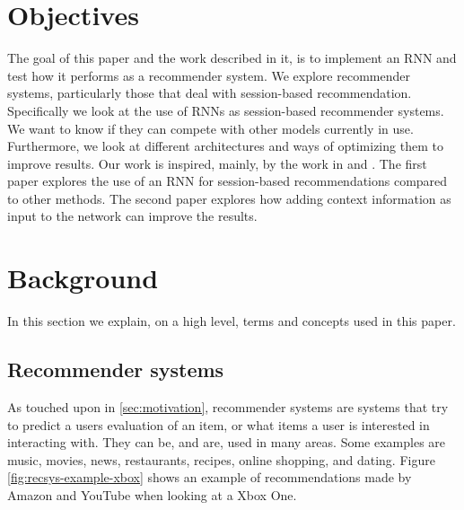\section{Objectives}
The goal of this paper and the work described in it, is to implement an RNN and test how it performs as a recommender system. We explore recommender systems, particularly those that deal with session-based recommendation. Specifically we look at the use of RNNs as session-based recommender systems. We want to know if they can compete with other models currently in use. Furthermore, we look at different architectures and ways of optimizing them to improve results. Our work is inspired, mainly, by the work in \cite{DBLP:journals/corr/HidasiKBT15} and \cite{DBLP:journals/corr/LiuWWL016}. The first paper explores the use of an RNN for session-based recommendations compared to other methods. The second paper explores how adding context information as input to the network can improve the results.





\section{Background}
In this section we explain, on a high level, terms and concepts used in this paper.

\subsection{Recommender systems}
As touched upon in \ref{sec:motivation}, recommender systems are systems that try to predict a users evaluation of an item, or what items a user is interested in interacting with. They can be, and are, used in many areas. Some examples are music, movies, news, restaurants, recipes, online shopping, and dating. Figure \ref{fig:recsys-example-xbox} shows an example of recommendations made by Amazon and YouTube when looking at a Xbox One.\\
	
